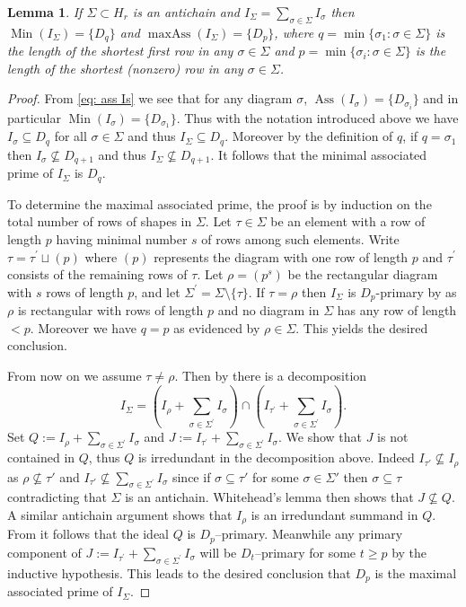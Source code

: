 \documentclass[11pt, reqno]{amsart}
\numberwithin{equation}{section}
\newtheorem{lemma}[theorem]{Lemma}
\theoremstyle{definition}
\DeclareMathOperator{\Ass}{Ass}
\DeclareMathOperator{\Min}{Min}
\DeclareMathOperator{\maxass}{maxAss}
\newcommand{\s}{\sigma}
\begin{document}
\begin{lemma}\label{lemma: symbolic power for sum of ideal invariant}
		If $\Sigma \subset H_r$ is an antichain and $I_\Sigma=\sum _{\sigma \in \Sigma}I_\sigma$ then $\Min(I_\Sigma)=\{D_q\}$ and
$ \maxass(I_\Sigma) = \{D_p\}$,  where  $q=\min\{\s_1: \s\in \Sigma\}$   is the  length of  the shortest first row in any $\sigma \in \Sigma$ and
$p=\min\{\s_i: \s\in \Sigma\}$  is the  length of  the shortest (nonzero) row in any $\sigma \in \Sigma$.
	\end{lemma}
	\begin{proof}
	From \eqref{eq: ass Is} we see that for any diagram $\s$, $\Ass(I_\s)=\{D_{\s_i}\}$ and in particular $\Min(I_\s)=\{D_{\s_1}\}$. Thus with the notation introduced above we have $I_\s\subseteq D_q$ for all $\s\in \Sigma$ and thus $I_\Sigma\subseteq D_q$. Moreover by the definition of $q$, if $q=\s_1$ then $I_\s\not \subseteq D_{q+1}$ and thus $I_\Sigma\not \subseteq D_{q+1}$. It follows that the minimal associated prime of $I_\Sigma$ is $D_q$.

	To determine the maximal associated prime, the proof is by induction on  the total number of rows of shapes in $\Sigma$.
		Let $\tau \in \Sigma$ be an element  with a row of length $p$ having minimal number $s$ of rows among such elements. Write $\tau=\tau^{\prime}\sqcup (p)$ where $(p)$ represents the diagram with one row of length $p$ and $\tau^{\prime}$ consists of the remaining rows of $\tau$. Let $\rho=(p^s)$ be the rectangular diagram with $s$ rows of  length $p$, and let $\Sigma^\prime =\Sigma \setminus \{\tau\}$. If $\tau=\rho$ then $I_\Sigma$ is $D_p$-primary by \cite[Corollary 5.3]{deconcini1980young} as $\rho$ is rectangular with rows of length $p$ and no diagram in $\Sigma$ has any row of length $<p$. Moreover we have $q=p$ as evidenced by $\rho\in \Sigma$. This yields the desired conclusion.

		From now on we assume $\tau\neq \rho$.
		Then by \cite[p.~153 last paragraph]{deconcini1980young} there is a decomposition
		$$I_\Sigma= \left( I_\rho+\sum_{\sigma \in \Sigma^\prime} I_\sigma \right) \cap \left(I_{\tau^\prime} +\sum_{\sigma\in \Sigma^\prime}I_\sigma  \right).$$
		Set  $Q:= I_\rho+\sum_{\sigma \in \Sigma^\prime} I_\sigma $ and $J := I_{\tau^\prime} +\sum_{\sigma\in \Sigma^\prime}I_\sigma $.
		We show that $J$ is not contained in $Q$, thus $Q$ is irredundant in the decomposition above. Indeed $I_{\tau'}\not\subseteq I_\rho$ as $\rho\not \subseteq \tau'$ and  $I_{\tau'}\not\subseteq \sum_{\sigma \in \Sigma^\prime} I_\sigma$ since if $\sigma\subseteq \tau'$ for some $\sigma\in \Sigma'$ then $\sigma\subseteq \tau$ contradicting that $\Sigma$ is an antichain. Whitehead's lemma \cite[Lemma  7.4]{WhiteheadThesis} then shows  that $J\not\subseteq Q$.
	A similar antichain argument shows that $I_\rho$ is an irredundant summand in $Q$. From \cite[Corollary 5.3]{deconcini1980young} it follows that the ideal $Q$ is  $D_p$--primary.  Meanwhile any primary component of $J := I_{\tau^\prime} +\sum_{\sigma\in \Sigma^\prime}I_\sigma $ will be $D_t$--primary for some  $t\geqslant p$ by the inductive hypothesis. This leads to the desired conclusion that $D_p$ is the maximal associated prime of $I_\Sigma$.	\end{proof}
\end{document}
